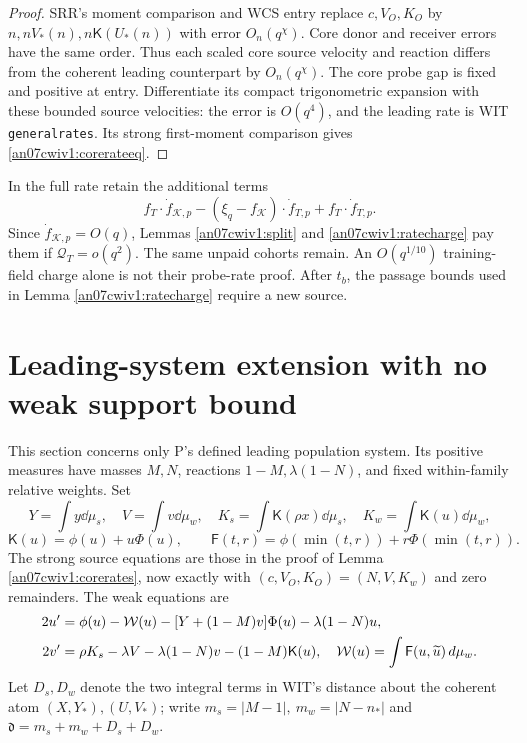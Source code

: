 \documentclass[11pt]{article}
\numberwithin{equation}{section}
\theoremstyle{remark}\newtheorem{remark}[theorem]{Remark}
\newcommand{\KK}{\mathcal K}\newcommand{\BB}{\mathcal B}
\newcommand{\Kfun}{\mathsf K}\newcommand{\Ffun}{\mathsf F}
\newcommand{\dist}{\mathfrak d}
\begin{document}
\begin{proof}
SRR's moment comparison and WCS entry replace \(c,V_O,K_O\)
by \(n,nV_*(n),n\Kfun(U_*(n))\) with error \(O_n(q^\chi)\).
Core donor and receiver errors have the same order.
Thus each scaled core source velocity and reaction differs
from the coherent leading counterpart by \(O_n(q^\chi)\).
The core probe gap is fixed and positive at entry. Differentiate
its compact trigonometric expansion with these bounded source
velocities: the error is \(O(q^4)\), and the leading rate is
WIT \texttt{generalrates}. Its strong first-moment comparison
gives \eqref{an07cwiv1:corerateeq}.
\end{proof}
In the full rate retain the additional terms
\[
 f_T\cdot\dot f_{\KK,p}
 -(\xi_q-f_\KK)\cdot\dot f_{T,p}
 +f_T\cdot\dot f_{T,p}.
 \]
Since \(\dot f_{\KK,p}=O(q)\), Lemmas
\ref{an07cwiv1:split} and \ref{an07cwiv1:ratecharge} pay them
if \(\mathcal Q_T=o(q^2)\). The same unpaid cohorts remain.
An \(O(q^{1/10})\) training-field charge alone is not their
probe-rate proof. After \(t_b\), the passage bounds used in
Lemma \ref{an07cwiv1:ratecharge} require a new source.

\section{Leading-system extension with no weak support bound}
\label{an07cwiv1:leading}
This section concerns only P's defined leading population
system. Its positive measures have masses \(M,N\), reactions
\(1-M,\lambda(1-N)\), and fixed within-family relative weights.
Set
\[
 Y=\int y\dd\mu_s,\quad V=\int v\dd\mu_w,\quad
 K_s=\int\Kfun(\rho x)\dd\mu_s,\quad
 K_w=\int\Kfun(u)\dd\mu_w ,
 \]
\[
 \Kfun(u)=\phi(u)+u\Phi(u),\qquad
 \Ffun(t,r)=\phi(\min(t,r))+r\Phi(\min(t,r)).
 \]
The strong source equations are those in the proof of
Lemma \ref{an07cwiv1:corerates}, now exactly with
\((c,V_O,K_O)=(N,V,K_w)\) and zero remainders.
The weak equations are
\begin{align}
 2u'&=\phi(u)-\mathcal W(u)
       -[Y+(1-M)v]\Phi(u)-\lambda(1-N)u,\notag\\
 2v'&=\rho K_s-\lambda V-\lambda(1-N)v-(1-M)\Kfun(u),
 \quad \mathcal W(u)=\int\Ffun(u,\widetilde u)\dd\mu_w.
 \label{an07cwiv1:weaksystem}
\end{align}
Let \(D_s,D_w\) denote the two integral terms in WIT's distance
about the coherent atom \((X,Y_*),(U,V_*)\); write
\(m_s=|M-1|,\ m_w=|N-n_*|\) and
\(\dist=m_s+m_w+D_s+D_w\).
\end{document}
